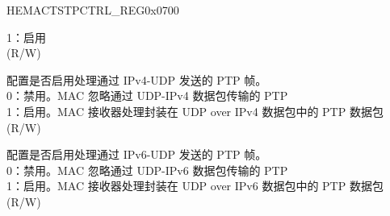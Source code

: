 \begin{register}{H}{EMACTSTPCTRL\_REG}{0x0700}
\begin{regdesc}
\begin{reglist}
1：启用\\(R/W)
\item [TSIPV4ENA] 配置是否启用处理通过 IPv4-UDP 发送的 PTP 帧。\\
0：禁用。MAC 忽略通过 UDP-IPv4 数据包传输的 PTP\\
1：启用。MAC 接收器处理封装在 UDP over IPv4 数据包中的 PTP 数据包\\(R/W)
\item [TSIPV6ENA] 配置是否启用处理通过 IPv6-UDP 发送的 PTP 帧。\\
0：禁用。MAC 忽略通过 UDP-IPv6 数据包传输的 PTP\\
1：启用。MAC 接收器处理封装在 UDP over IPv6 数据包中的 PTP 数据包\\(R/W)

\item [见下页...]
\end{reglist}\end{regdesc}
\end{register}

